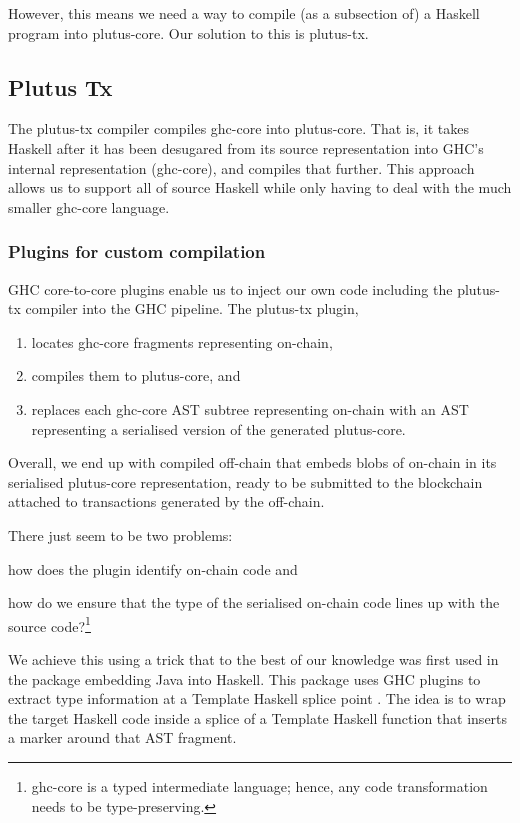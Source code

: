 However, this means we need a way to compile (as a subsection of) a Haskell program into \gls{plutus-core}.
Our solution to this is \gls{plutus-tx}.

\subsection{Plutus Tx}
\label{sec:plutus-tx}

The \gls{plutus-tx} compiler compiles \gls{ghc-core} into \gls{plutus-core}.
That is, it takes Haskell after it has been desugared from its source representation into GHC's internal representation (\gls{ghc-core}), and compiles that further.
This approach allows us to support all of source Haskell while only having to deal with the much smaller \gls{ghc-core} language.

\subsubsection{Plugins for custom compilation}

GHC core-to-core plugins enable us to inject our own code including the \gls{plutus-tx} compiler into the GHC pipeline.
The \gls{plutus-tx} plugin,
\begin{enumerate}
\item locates \gls{ghc-core} fragments representing \gls{on-chain},
\item compiles them to \gls{plutus-core}, and
\item replaces each \gls{ghc-core} AST subtree representing \gls{on-chain} with an AST representing a serialised version of the generated \gls{plutus-core}.
\end{enumerate}

Overall, we end up with compiled \gls{off-chain} that embeds blobs of \gls{on-chain} in its serialised \gls{plutus-core} representation, ready to be submitted to the blockchain attached to transactions generated by the \gls{off-chain}.

There just seem to be two problems:
\begin{inparaenum}
\item how does the plugin identify on-chain code and
\item how do we ensure that the type of the serialised on-chain code lines up with the source code?\footnote{
\Gls{ghc-core} is a typed intermediate language; hence, any code transformation needs to be type-preserving.
}
\end{inparaenum}
We achieve this using a trick that to the best of our knowledge was first used in the  package embedding Java into Haskell.
This package uses GHC plugins to extract type information at a Template Haskell splice point \autocite{inline-java-blog-post}.
The idea is to wrap the target Haskell code inside a splice of a Template Haskell function that inserts a marker around that AST fragment.

